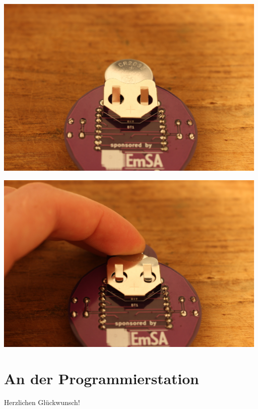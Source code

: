 \documentclass{article}
\begin{document}
\begin{minipage}[b]{0.5\textwidth}
	\includegraphics[width=\textwidth]{Bilder2024/IMG_0078.JPG}
\end{minipage}
\begin{minipage}[b]{0.5\textwidth}
	\includegraphics[width=\textwidth]{Bilder2024/IMG_0079.JPG}
\end{minipage}

\vspace{0.5cm}

\section{An der Programmierstation}

Herzlichen Glückwunsch! \\
\end{document}
